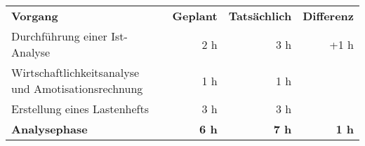 \begin{tabular}{lrrr}
\rowcolor{heading}\textbf{Vorgang} & \textbf{Geplant} & \textbf{Tatsächlich} & \textbf{Differenz} \\
Durchführung einer Ist-Analyse & 2 h   & 3 h   & +1 h \\
\rowcolor{odd}Wirtschaftlichkeitsanalyse und Amotisationsrechnung & 1 h   & 1 h   &  \\
Erstellung eines Lastenhefts & 3 h   & 3 h   &  \\
\hline
\hline
\rowcolor{heading}\textbf{Analysephase} & \textbf{6 h} & \textbf{7 h} & \textbf{1 h} \\
\end{tabular}
